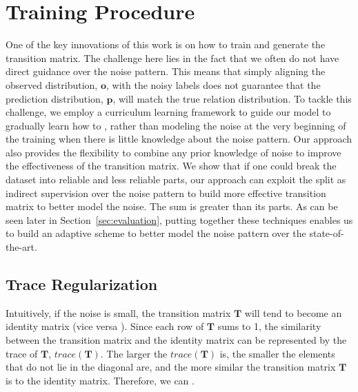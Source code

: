\section{Training Procedure \label{sec:training}}

One of the key innovations of this work is on how to train and generate the
transition matrix. The challenge here lies in the fact that we often do not have 
direct guidance over the noise pattern. 
This means that simply aligning the observed distribution, $\mathbf{o}$, with the noisy labels does not
guarantee that the prediction distribution, $\mathbf{p}$, will match the true
relation distribution. To tackle this challenge, we employ a curriculum
learning framework to guide our model to gradually learn how to 
,
rather than modeling the noise at the very beginning of the training when
there is little knowledge about the noise pattern.
%
Our approach also provides the
flexibility to combine any prior knowledge of noise to improve the
effectiveness of  the transition matrix. We show that if one could break the
dataset into reliable and less reliable parts, our approach can exploit the split
as indirect supervision over the noise pattern to build more effective
transition matrix to better model the noise. The sum is greater than its parts. 
As can be seen later in Section~\ref{sec:evaluation}, putting together these techniques
enables us to build an adaptive scheme to better model the noise pattern over the state-of-the-art. 




\subsection{Trace Regularization}
Intuitively, if the noise is small, the transition matrix $\mathbf{T}$ will tend to become an identity matrix (vice versa ).  Since each row of $\mathbf{T}$ sums to 1, the similarity between the transition matrix and the identity matrix can be represented by the trace of $\mathbf{T}$, $trace(\mathbf{T})$. The larger the $trace(\mathbf{T})$ is, the smaller the elements that do not lie in the diagonal are, and the more similar the transition matrix $\mathbf{T}$ is to the identity matrix. Therefore, we can . 

